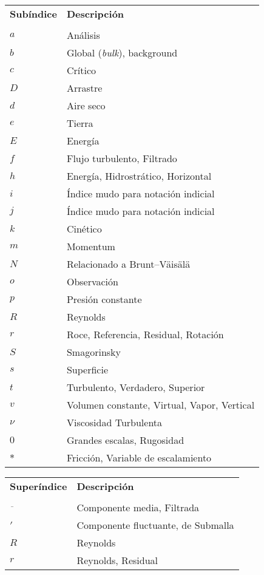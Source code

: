 \begin{tabular}{ll}
	\textbf{Subíndice} & \textbf{Descripción}\\
	& \\
	$a$ & Análisis \\
	$b$ & Global (\emph{bulk}), background \\
	$c$ & Crítico \\
	$D$ & Arrastre \\
	$d$ & Aire seco \\
	$e$ & Tierra \\
	$E$ & Energía \\	
	$f$ & Flujo turbulento, Filtrado \\
	$h$ & Energía, Hidrostrático, Horizontal     \\
	$i$ & Índice mudo para notación indicial     \\
	$j$ & Índice mudo para notación indicial     \\
	$k$ & Cinético    \\
	$m$ & Momentum  	\\
	$N$ & Relacionado a Brunt–Väisälä \\
	$o$ & Observación \\
	$p$ & Presión constante \\
	$R$ & Reynolds \\	
	$r$ & Roce, Referencia, Residual, Rotación     \\
	$S$ & Smagorinsky \\
	$s$ & Superficie    \\
	$t$ & Turbulento, Verdadero, Superior \\
	$v$ & Volumen constante, Virtual, Vapor, Vertical \\
	$\nu$ & Viscosidad Turbulenta \\
	$0$ & Grandes escalas, Rugosidad\\
	$*$ & Fricción, Variable de escalamiento \\	
\end{tabular}

\bigskip
\begin{tabular}{ll}
	\textbf{Superíndice} & \textbf{Descripción}\\
	 & \\
	$\overline{\,\,\,}$ & Componente media, Filtrada      \\
	$'$ & Componente fluctuante, de Submalla  	\\
	$R$ & Reynolds \\
	$r$ & Reynolds, Residual \\
\end{tabular}